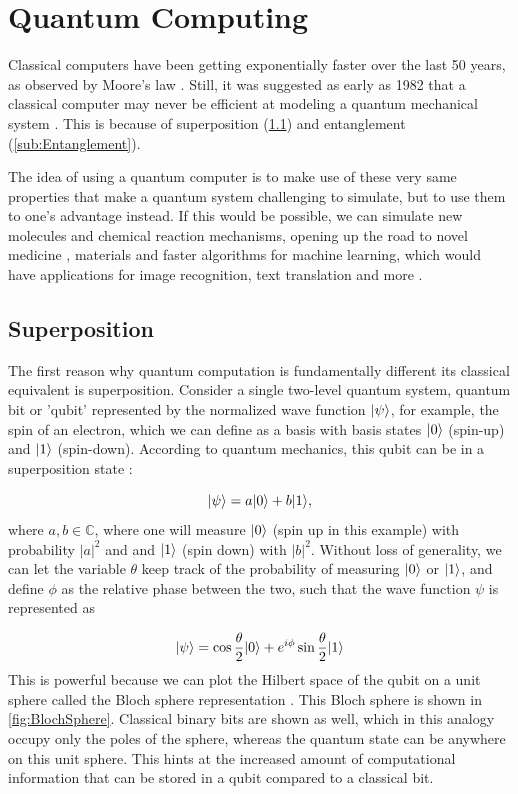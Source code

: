 \section{Quantum Computing}

Classical computers have been getting exponentially faster over the last 50 years, as observed by Moore's law \cite{Moore1965}. 
Still, it was suggested as early as 1982 that a classical computer may never be efficient at modeling a quantum mechanical system \cite{Feynman1982}. 
This is because of superposition (\cref{sub:Superposition}) and entanglement (\cref{sub:Entanglement}). 

The idea of using a quantum computer is to make use of these very same properties that make a quantum system challenging to simulate, but to use them to one's advantage instead. 
If this would be possible, we can simulate new molecules and chemical reaction mechanisms, opening up the road to novel medicine \cite{Robert2021}, materials \cite{Ma2020} and faster algorithms for machine learning, which would have applications for image recognition, text translation and more \cite{Huang2021}.

\subsection{Superposition}\label{sub:Superposition}

The first reason why quantum computation is fundamentally different its classical equivalent is superposition.
Consider a single two-level quantum system, quantum bit or 'qubit' represented by the normalized wave function $\lvert\psi\rangle$, for example, the spin of an electron, which we can define as a basis with basis states $\lvert0\rangle$ (spin-up) and $\lvert1\rangle$ (spin-down). 
According to quantum mechanics, this qubit can be in a superposition state \cite{Griffiths2004}:

\begin{equation}\label{eq:SuperPositionBasic}
	\lvert\psi\rangle=a\lvert0\rangle+b\lvert1\rangle,
\end{equation}
where $a,b \in \mathbb{C}$, where one will measure $\lvert0\rangle$ (spin up in this example) with probability $|a|^2$ and and $\lvert1\rangle$ (spin down) with $|b|^2$. 
Without loss of generality, we can let the variable $\theta$ keep track of the probability of measuring $\lvert0\rangle$ or $\lvert1\rangle$, and define $\phi$ as the relative phase between the two, such that the wave function $\psi$ is represented as

\begin{equation}\label{eq:BlochSphere}
	\lvert\psi\rangle = 
	\cos{\frac{\theta}{2}} \lvert0\rangle + e^{i \phi} \sin{\frac{\theta}{2}} \lvert1\rangle
\end{equation}
This is powerful because we can plot the Hilbert space of the qubit on a unit sphere called the Bloch sphere representation \cite{Nielsen2011}.
This Bloch sphere is shown in \cref{fig:BlochSphere}.
Classical binary bits are shown as well, which in this analogy occupy only the poles of the sphere, whereas the quantum state can be anywhere on this unit sphere. 
This hints at the increased amount of computational information that can be stored in a qubit compared to a classical bit. 

